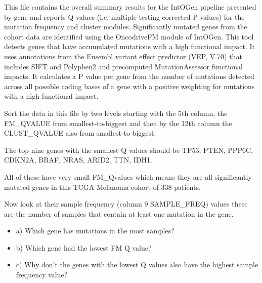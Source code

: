 \begin{information}
This file contains the overall summary results for the IntOGen pipeline presented by
gene and reports Q values (i.e. multiple testing corrected P values) for the mutation
frequency and cluster modules.
\vspace{4 mm}
Significantly mutated genes from the cohort data are identified using the OncodriveFM
module of IntOGen. This tool detects genes that have accumulated mutations with a
high functional impact. It uses annotations from the Ensembl variant effect predictor
(VEP, V.70) that includes SIFT and Polyphen2 and precomputed MutationAssessor functional
impacts. It calculates a P value per gene from the number of mutations detected across
all possible coding bases of a gene with a positive weighting for mutations with a high
functional impact.
\end{information}

\begin{steps}
Sort the data in this file by two levels starting with the 5th column,
the FM\_QVALUE from smallest-to-biggest and then by the 12th column the
CLUST\_QVALUE also from smallest-to-biggest.
\end{steps}

The top nine genes with the smallest Q values should be
TP53, PTEN, PPP6C, CDKN2A, BRAF, NRAS, ARID2, TTN, IDH1.

\begin{information}
All of these have very small FM\_Qvalues which means they are all significantly
mutated genes in this TCGA Melanoma cohort of 338 patients.
\end{information}

\begin{steps}
Now look at their sample frequency (column 9 SAMPLE\_FREQ) values these are
the number of samples that contain at least one mutation in the gene.
\end{steps}

\begin{questions}
\begin{itemize}
\item a) Which gene has mutations in the most samples?
\item b) Which gene had the lowest FM Q value?
\item c) Why don't the genes with the lowest Q values also have the highest sample frequency
value?
\end{itemize}
\end{questions}

